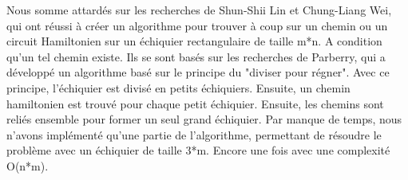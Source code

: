 Nous somme attardés sur les recherches de Shun-Shii Lin et Chung-Liang Wei, qui ont réussi à créer un algorithme pour trouver à coup sur un chemin ou un circuit Hamiltonien sur un échiquier rectangulaire de taille m*n.  A condition qu'un tel chemin existe. Ils se sont basés sur les recherches de Parberry, qui a développé un algorithme basé sur le principe du "diviser pour régner". Avec ce principe, l'échiquier est divisé en petits échiquiers. Ensuite, un chemin hamiltonien est trouvé pour chaque petit échiquier. Ensuite, les chemins sont reliés ensemble pour former un seul grand échiquier. Par manque de temps, nous n'avons implémenté qu'une partie de l'algorithme, permettant de résoudre le problème avec un échiquier de taille 3*m. Encore une fois avec une complexité O(n*m).

